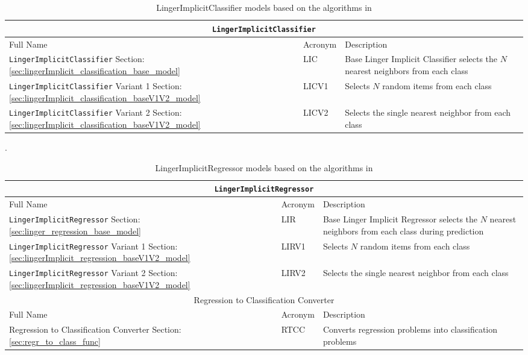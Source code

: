 \documentclass[a4paper, 12pt]{report}
\begin{document}
\begin{table}[H]
    \centering
    \begin{tabular}{ |p{6cm}|p{2cm}|p{9cm}| }
        \hline
        \multicolumn{3}{|c|}{\texttt{LingerImplicitClassifier}} \\
        \hline
        Full Name & Acronym & Description \\
        \hline
        \texttt{LingerImplicitClassifier} Section: \ref{sec:lingerImplicit_classification_base_model} & LIC & Base Linger Implicit Classifier selects the $N$ nearest neighbors from each class \\
        \hline
        \texttt{LingerImplicitClassifier} Variant 1 Section: \ref{sec:lingerImplicit_classification_baseV1V2_model} & LICV1 & Selects $N$ random items from each class \\
        \hline
        \texttt{LingerImplicitClassifier} Variant 2 Section: \ref{sec:lingerImplicit_classification_baseV1V2_model} & LICV2 & Selects the single nearest neighbor from each class \\
        \hline
    \end{tabular}
    \caption{LingerImplicitClassifier models based on the algorithms in \cite{ye2021learning}}. 
    \label{tab:LingerImplicitClassifier_models}
\end{table}

\begin{table}[H]
    \centering
    \begin{tabular}{ |p{6cm}|p{2cm}|p{9cm}| }
        \hline
        \multicolumn{3}{|c|}{\texttt{LingerImplicitRegressor}} \\
        \hline
        Full Name & Acronym & Description \\
        \hline
        \texttt{LingerImplicitRegressor} Section: \ref{sec:linger_regression_base_model} & LIR & Base Linger Implicit Regressor selects the $N$ nearest neighbors from each class during prediction \\
        \hline
        \texttt{LingerImplicitRegressor} Variant 1 Section: \ref{sec:lingerImplicit_regression_baseV1V2_model} & LIRV1 & Selects $N$ random items from each class \\
        \hline
        \texttt{LingerImplicitRegressor} Variant 2 Section: \ref{sec:lingerImplicit_regression_baseV1V2_model} & LIRV2 & Selects the single nearest neighbor from each class \\
        \hline
        \multicolumn{3}{|c|}{Regression to Classification Converter} \\
        \hline
        Full Name & Acronym & Description \\
        \hline
        Regression to Classification Converter Section: \ref{sec:regr_to_class_func} & RTCC & Converts regression problems into classification problems \\
        \hline
    \end{tabular}
    \caption{LingerImplicitRegressor models based on the algorithms in \cite{ye2021learning}}
    \label{tab:ingerImplicitRegressor_models}
\end{table}
\end{document}
